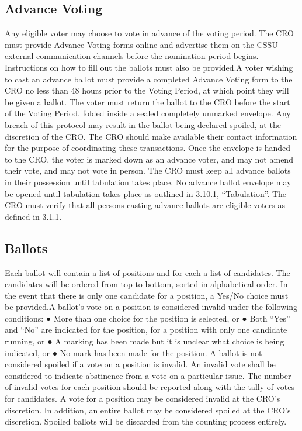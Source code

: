 \documentclass{article}
\begin{document}
\subsection{Advance Voting} \label{sec:3.9}
Any eligible voter may choose to vote in advance of the voting period. The CRO must provide
Advance Voting forms online and advertise them on the CSSU external communication
channels before the nomination period begins. Instructions on how to fill out the ballots must
also be provided.A voter wishing to cast an advance ballot must provide a completed Advance Voting form to the
CRO no less than 48 hours prior to the Voting Period, at which point they will be given a
ballot.
The voter must return the ballot to the CRO before the start of the Voting Period, folded inside a
sealed completely unmarked envelope. Any breach of this protocol may result in the ballot being
declared spoiled, at the discretion of the CRO. The CRO should make available their contact
information for the purpose of coordinating these transactions.
Once the envelope is handed to the CRO, the voter is marked down as an advance voter, and
may not amend their vote, and may not vote in person.
The CRO must keep all advance ballots in their possession until tabulation takes place. No
advance ballot envelope may be opened until tabulation takes place as outlined in 3.10.1,
“Tabulation”.
The CRO must verify that all persons casting advance ballots are eligible voters as defined in
3.1.1.

\subsection{Ballots} \label{sec:3.10}
Each ballot will contain a list of positions and for each a list of candidates. The candidates will
be ordered from top to bottom, sorted in alphabetical order.
In the event that there is only one candidate for a position, a Yes/No choice must be provided.A
ballot's vote on a position is considered invalid under the following conditions:
● More than one choice for the position is selected, or
● Both “Yes” and “No” are indicated for the position, for a position with only one candidate
running, or
● A marking has been made but it is unclear what choice is being indicated, or
● No mark has been made for the position.
A ballot is not considered spoiled if a vote on a position is invalid. An invalid vote shall be
considered to indicate abstinence from a vote on a particular issue. The number of invalid votes
for each position should be reported along with the tally of votes for candidates.
A vote for a position may be considered invalid at the CRO’s discretion. In addition, an entire
ballot may be considered spoiled at the CRO’s discretion. Spoiled ballots will be discarded from
the counting process entirely.
\end{document}

